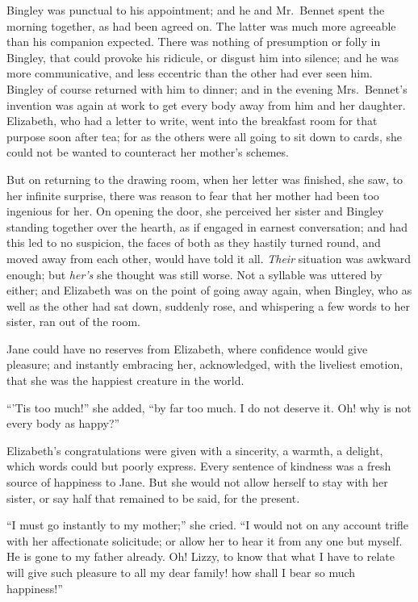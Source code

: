 Bingley was punctual to his appointment; and he and
Mr.\ Bennet spent the morning together, as had been agreed
on. The latter was much more agreeable than his companion
expected. There was nothing of presumption or
folly in Bingley, that could provoke his ridicule, or disgust
him into silence; and he was more communicative, and
less eccentric than the other had ever seen him. Bingley
of course returned with him to dinner; and in the evening
Mrs.\ Bennet’s invention was again at work to get every
body away from him and her daughter. Elizabeth, who
had a letter to write, went into the breakfast room for
that purpose soon after tea; for as the others were all
going to sit down to cards, she could not be wanted to
counteract her mother’s schemes.

But on returning to the drawing room, when her letter
was finished, she saw, to her infinite surprise, there was
reason to fear that her mother had been too ingenious for
her. On opening the door, she perceived her sister and
Bingley standing together over the hearth, as if engaged in
earnest conversation; and had this led to no suspicion,
the faces of both as they hastily turned round, and moved
away from each other, would have told it all. \textit{Their}
situation was awkward enough; but \textit{her’s} she thought was
still worse. Not a syllable was uttered by either; and Elizabeth
was on the point of going away again, when Bingley,
who as well as the other had sat down, suddenly rose, and
whispering a few words to her sister, ran out of the room.

Jane could have no reserves from Elizabeth, where
confidence would give pleasure; and instantly embracing
her, acknowledged, with the liveliest emotion, that she
was the happiest creature in the world.

“’Tis too much!” she added, “by far too much. I do
not deserve it. Oh! why is not every body as happy?”

Elizabeth’s congratulations were given with a sincerity,
a warmth, a delight, which words could but poorly express.
Every sentence of kindness was a fresh source of happiness
to Jane. But she would not allow herself to stay with her
sister, or say half that remained to be said, for the present.

“I must go instantly to my mother;” she cried.
“I would not on any account trifle with her affectionate
solicitude; or allow her to hear it from any one but myself.
He is gone to my father already. Oh! Lizzy, to know
that what I have to relate will give such pleasure to all
my dear family! how shall I bear so much happiness!”

